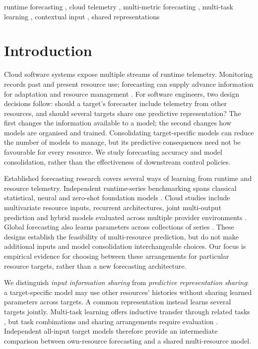 \documentclass[a4paper,fleqn]{cas-dc}
\begin{document}
\begin{keywords}
runtime forecasting \sep
cloud telemetry \sep
multi-metric forecasting \sep
multi-task learning \sep
contextual input \sep
shared representations
\end{keywords}

\maketitle

\section{Introduction}
\label{sec:introduction}

Cloud software systems expose multiple streams of runtime telemetry.
Monitoring records past and present resource use; forecasting can supply
advance information for adaptation and resource management
\citep{Taherizadeh2018Monitoring,Bauer2020SelfAware}.
For software engineers, two design decisions follow: should a target's
forecaster include telemetry from other resources, and should several targets
share one predictive representation? The first changes the information
available to a model; the second changes how models are organised and trained.
Consolidating target-specific models can reduce the number of models to
manage, but its predictive consequences need not be favourable for every
resource. We study forecasting accuracy and model consolidation, rather than
the effectiveness of downstream control policies.

Established forecasting research covers several ways of learning from
runtime and resource telemetry. Independent runtime-series benchmarking spans
classical statistical, neural and zero-shot foundation models
\citep{DiMenna2026RuntimeForecasting}. Cloud studies include multivariate
resource inputs, recurrent architectures, joint multi-output prediction and
hybrid models evaluated across multiple provider environments
\citep{Ullah2023CloudBiLSTM,Tripathi2025MMRP}. Global forecasting also learns
parameters across collections of series \citep{Salinas2020DeepAR}.
These designs establish the feasibility of multi-resource prediction, but
do not make additional inputs and model consolidation interchangeable choices.
Our focus is empirical evidence for choosing between these arrangements for
particular resource targets, rather than a new forecasting architecture.

We distinguish \emph{input information sharing} from \emph{predictive
representation sharing}: a target-specific model may use other resources'
histories without sharing learned parameters across targets. A common
representation instead learns several targets jointly. Multi-task learning
offers inductive transfer through related tasks \citep{Caruana1997Multitask},
but task combinations and sharing arrangements require evaluation
\citep{Standley2020TaskGrouping,Fifty2021TaskGroupings,Nochumsohn2025MTLinear}.
Independent all-input target models therefore provide an intermediate
comparison between own-resource forecasting and a shared multi-resource model.
\end{document}
